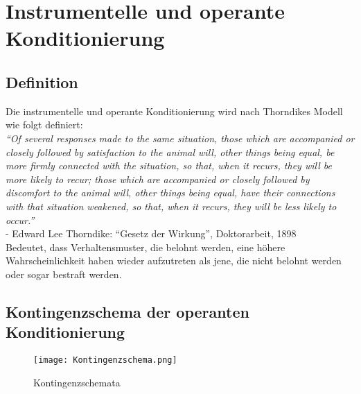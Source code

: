 	\section{Instrumentelle und operante Konditionierung}
	
	\newpage

		\subsection{Definition}
		
Die instrumentelle und operante Konditionierung wird nach Thorndikes Modell wie folgt definiert: \\
\textit{“Of several responses made to the same situation, those which are accompanied or closely followed by satisfaction to the animal will, other things being equal, be more firmly connected with the situation, so that, when it recurs, they will be more likely to recur; those which are accompanied or closely followed by discomfort to the animal will, other things being equal, have their connections with that situation weakened, so that, when it recurs, they will be less likely to occur.”} \\
- Edward Lee Thorndike: “Gesetz der Wirkung”, Doktorarbeit, 1898 \\
Bedeutet, dass Verhaltensmuster, die belohnt werden, eine höhere Wahrscheinlichkeit haben wieder aufzutreten als jene, die nicht belohnt werden oder sogar bestraft werden. 


		\subsection{Kontingenzschema der operanten Konditionierung}
		
		\begin{center}
		\begin{figure}[h]
    \centering
    \texttt{[image: Kontingenzschema.png]}
    \caption{Kontingenzschemata}
		\end{figure}
		\end{center}
		
